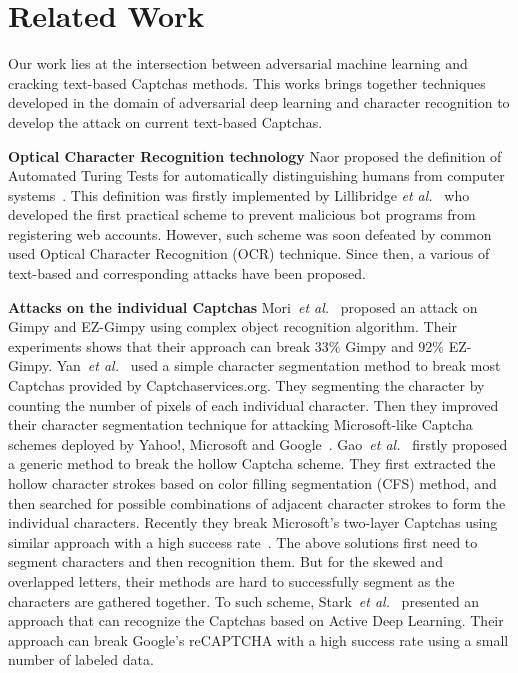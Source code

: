 \section{Related Work}
Our work lies at the intersection between adversarial machine learning and cracking text-based Captchas methods. This works brings together techniques developed in the domain of adversarial deep learning and character recognition to develop the attack on current text-based Captchas.

\noindent \textbf{Optical Character Recognition technology} Naor proposed the definition of Automated Turing Tests for automatically distinguishing humans from computer systems~\cite{Naor1996Verification}. This definition was firstly implemented by Lillibridge \emph{et al.}~\cite{Lillibridge2001Method} who developed the first practical scheme to prevent malicious bot programs from registering web accounts. However, such scheme was soon defeated by common used Optical Character Recognition (OCR) technique. Since then, a various of text-based and corresponding attacks have been proposed.

\noindent \textbf{Attacks on the individual Captchas} Mori~\emph{et al.}~\cite{Mori2003Recognizing} proposed an attack on Gimpy and EZ-Gimpy using complex object recognition algorithm. Their experiments shows that their approach can break 33\% Gimpy and 92\% EZ-Gimpy. Yan~\emph{et al.}~\cite{Yan2007Breaking} used a simple character segmentation method to break most Captchas provided by Captchaservices.org. They segmenting the character by counting the number of pixels of each individual character. Then they improved their character segmentation technique for attacking Microsoft-like Captcha schemes deployed by Yahoo!, Microsoft and Google~\cite{Yan2008A}. Gao~\emph{et al.}~\cite{Gao2013The} firstly proposed a generic method to break the hollow Captcha scheme. They first extracted the hollow character strokes based on color filling segmentation (CFS) method, and then searched for possible combinations of adjacent character strokes to form the individual characters. Recently they break Microsoft’s two-layer Captchas using similar approach with a high success rate~\cite{Gao2017Research}.
The above solutions first need to segment characters and then recognition them. But for the skewed and overlapped letters, their methods are hard to successfully segment as the characters are gathered together. To such scheme, Stark~\emph{et al.}~\cite{Stark2015CAPTCHA} presented an approach that can recognize the Captchas based on Active Deep Learning. Their approach can break Google's reCAPTCHA with a high success rate using a small number of labeled data.

